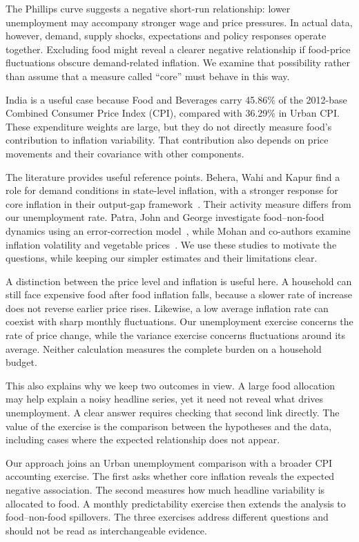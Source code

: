 \documentclass[10pt,a4paper]{article}
\begin{document}
The Phillips curve suggests a negative short-run relationship: lower unemployment may accompany stronger wage and price pressures. In actual data, however, demand, supply shocks, expectations and policy responses operate together. Excluding food might reveal a clearer negative relationship if food-price fluctuations obscure demand-related inflation. We examine that possibility rather than assume that a measure called ``core'' must behave in this way.

India is a useful case because Food and Beverages carry 45.86\% of the 2012-base Combined Consumer Price Index (CPI), compared with 36.29\% in Urban CPI. These expenditure weights are large, but they do not directly measure food's contribution to inflation variability. That contribution also depends on price movements and their covariance with other components.

The literature provides useful reference points. Behera, Wahi and Kapur find a role for demand conditions in state-level inflation, with a stronger response for core inflation in their output-gap framework~\cite{behera2017}. Their activity measure differs from our unemployment rate. Patra, John and George investigate food--non-food dynamics using an error-correction model~\cite{patra2024}, while Mohan and co-authors examine inflation volatility and vegetable prices~\cite{mohan2026}. We use these studies to motivate the questions, while keeping our simpler estimates and their limitations clear.

A distinction between the price level and inflation is useful here. A household can still face expensive food after food inflation falls, because a slower rate of increase does not reverse earlier price rises. Likewise, a low average inflation rate can coexist with sharp monthly fluctuations. Our unemployment exercise concerns the rate of price change, while the variance exercise concerns fluctuations around its average. Neither calculation measures the complete burden on a household budget.

This also explains why we keep two outcomes in view. A large food allocation may help explain a noisy headline series, yet it need not reveal what drives unemployment. A clear answer requires checking that second link directly. The value of the exercise is the comparison between the hypotheses and the data, including cases where the expected relationship does not appear.

Our approach joins an Urban unemployment comparison with a broader CPI accounting exercise. The first asks whether core inflation reveals the expected negative association. The second measures how much headline variability is allocated to food. A monthly predictability exercise then extends the analysis to food--non-food spillovers. The three exercises address different questions and should not be read as interchangeable evidence.
\end{document}
